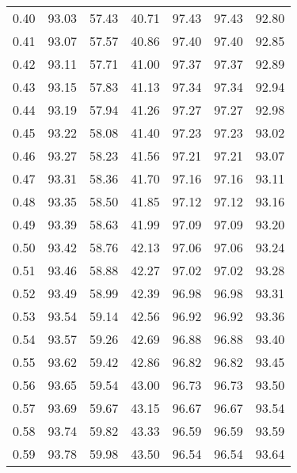 \begin{tabular}{|c|c|c|c|c|c|c|}
      0.40 &     93.03 &     57.43 &      40.71 &   97.43 &      97.43 &         92.80 \\
      0.41 &     93.07 &     57.57 &      40.86 &   97.40 &      97.40 &         92.85 \\
      0.42 &     93.11 &     57.71 &      41.00 &   97.37 &      97.37 &         92.89 \\
      0.43 &     93.15 &     57.83 &      41.13 &   97.34 &      97.34 &         92.94 \\
      0.44 &     93.19 &     57.94 &      41.26 &   97.27 &      97.27 &         92.98 \\
      0.45 &     93.22 &     58.08 &      41.40 &   97.23 &      97.23 &         93.02 \\
      0.46 &     93.27 &     58.23 &      41.56 &   97.21 &      97.21 &         93.07 \\
      0.47 &     93.31 &     58.36 &      41.70 &   97.16 &      97.16 &         93.11 \\
      0.48 &     93.35 &     58.50 &      41.85 &   97.12 &      97.12 &         93.16 \\
      0.49 &     93.39 &     58.63 &      41.99 &   97.09 &      97.09 &         93.20 \\
      0.50 &     93.42 &     58.76 &      42.13 &   97.06 &      97.06 &         93.24 \\
      0.51 &     93.46 &     58.88 &      42.27 &   97.02 &      97.02 &         93.28 \\
      0.52 &     93.49 &     58.99 &      42.39 &   96.98 &      96.98 &         93.31 \\
      0.53 &     93.54 &     59.14 &      42.56 &   96.92 &      96.92 &         93.36 \\
      0.54 &     93.57 &     59.26 &      42.69 &   96.88 &      96.88 &         93.40 \\
      0.55 &     93.62 &     59.42 &      42.86 &   96.82 &      96.82 &         93.45 \\
      0.56 &     93.65 &     59.54 &      43.00 &   96.73 &      96.73 &         93.50 \\
      0.57 &     93.69 &     59.67 &      43.15 &   96.67 &      96.67 &         93.54 \\
      0.58 &     93.74 &     59.82 &      43.33 &   96.59 &      96.59 &         93.59 \\
      0.59 &     93.78 &     59.98 &      43.50 &   96.54 &      96.54 &         93.64 \\

\end{tabular}
